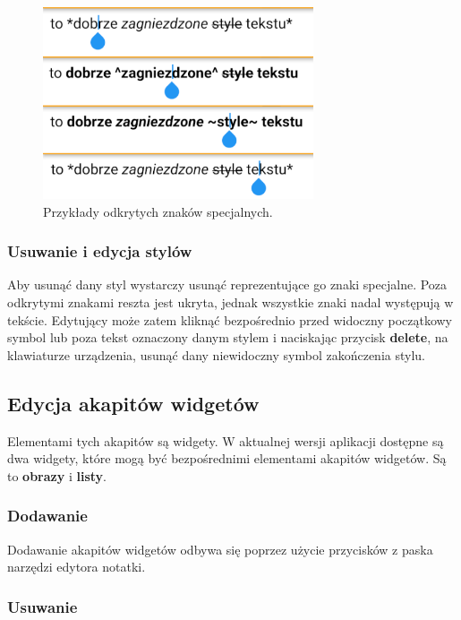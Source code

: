 \begin{figure}[ht]
    \centering
    \includegraphics[width=8cm]{images/pokazywanie_znakow_specjalnych.png}
    \caption{Przykłady odkrytych znaków specjalnych.}
    \vspace{3mm}
\end{figure}

\subsubsection{Usuwanie i edycja stylów}

Aby usunąć dany styl wystarczy usunąć reprezentujące go znaki specjalne. Poza odkrytymi znakami reszta jest ukryta, jednak wszystkie znaki nadal występują w tekście. Edytujący może zatem kliknąć bezpośrednio przed widoczny początkowy symbol lub poza tekst oznaczony danym stylem i naciskając przycisk \textbf{delete}, na klawiaturze urządzenia, usunąć dany niewidoczny symbol zakończenia stylu.

\subsection{Edycja akapitów widgetów}

Elementami tych akapitów są widgety. W aktualnej wersji aplikacji dostępne są dwa widgety, które mogą być bezpośrednimi elementami akapitów widgetów.
Są to \textbf{obrazy} i \textbf{listy}.

\subsubsection{Dodawanie}
\label{sub:dodawanieWidgetow}

Dodawanie akapitów widgetów odbywa się poprzez użycie przycisków z paska narzędzi edytora notatki.

\subsubsection{Usuwanie}
\label{sub:usuwanieWidgetow}

